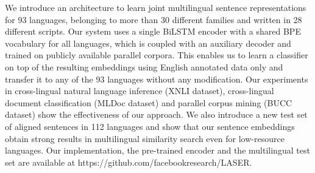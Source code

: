 We introduce an architecture to learn joint multilingual sentence representations for 93 languages, belonging to more than 30 different families and written in 28 different scripts. Our system uses a single BiLSTM encoder with a shared BPE vocabulary for all languages, which is coupled with an auxiliary decoder and trained on publicly available parallel corpora. This enables us to learn a classifier on top of the resulting embeddings using English annotated data only and transfer it to any of the 93 languages without any modification. Our experiments in cross-lingual natural language inference (XNLI dataset), cross-lingual document classification (MLDoc dataset) and parallel corpus mining (BUCC dataset) show the effectiveness of our approach. We also introduce a new test set of aligned sentences in 112 languages and show that our sentence embeddings obtain strong results in multilingual similarity search even for low-resource languages. Our implementation, the pre-trained encoder and the multilingual test set are available at https://github.com/facebookresearch/LASER.